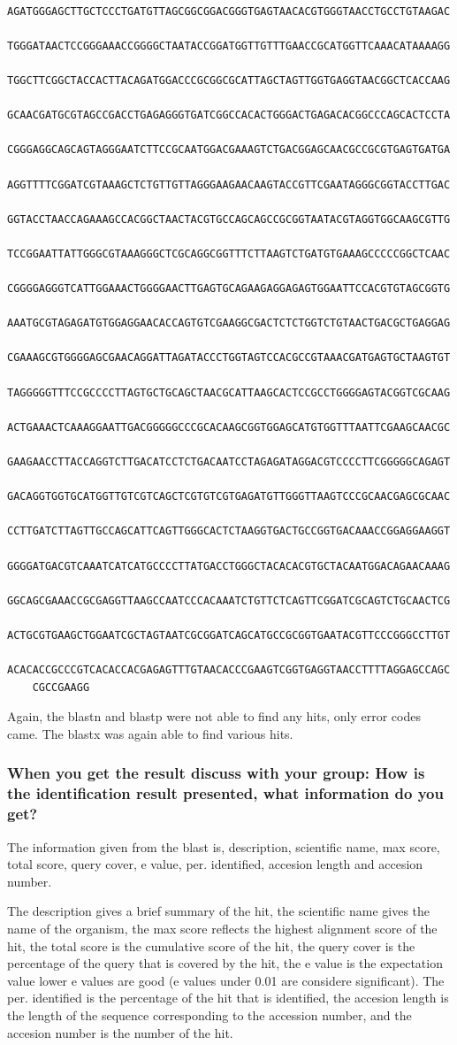 \begin{verbatim}
    AGATGGGAGCTTGCTCCCTGATGTTAGCGGCGGACGGGTGAGTAACACGTGGGTAACCTGCCTGTAAGAC
    TGGGATAACTCCGGGAAACCGGGGCTAATACCGGATGGTTGTTTGAACCGCATGGTTCAAACATAAAAGG
    TGGCTTCGGCTACCACTTACAGATGGACCCGCGGCGCATTAGCTAGTTGGTGAGGTAACGGCTCACCAAG
    GCAACGATGCGTAGCCGACCTGAGAGGGTGATCGGCCACACTGGGACTGAGACACGGCCCAGCACTCCTA
    CGGGAGGCAGCAGTAGGGAATCTTCCGCAATGGACGAAAGTCTGACGGAGCAACGCCGCGTGAGTGATGA
    AGGTTTTCGGATCGTAAAGCTCTGTTGTTAGGGAAGAACAAGTACCGTTCGAATAGGGCGGTACCTTGAC
    GGTACCTAACCAGAAAGCCACGGCTAACTACGTGCCAGCAGCCGCGGTAATACGTAGGTGGCAAGCGTTG
    TCCGGAATTATTGGGCGTAAAGGGCTCGCAGGCGGTTTCTTAAGTCTGATGTGAAAGCCCCCGGCTCAAC
    CGGGGAGGGTCATTGGAAACTGGGGAACTTGAGTGCAGAAGAGGAGAGTGGAATTCCACGTGTAGCGGTG
    AAATGCGTAGAGATGTGGAGGAACACCAGTGTCGAAGGCGACTCTCTGGTCTGTAACTGACGCTGAGGAG
    CGAAAGCGTGGGGAGCGAACAGGATTAGATACCCTGGTAGTCCACGCCGTAAACGATGAGTGCTAAGTGT
    TAGGGGGTTTCCGCCCCTTAGTGCTGCAGCTAACGCATTAAGCACTCCGCCTGGGGAGTACGGTCGCAAG
    ACTGAAACTCAAAGGAATTGACGGGGGCCCGCACAAGCGGTGGAGCATGTGGTTTAATTCGAAGCAACGC
    GAAGAACCTTACCAGGTCTTGACATCCTCTGACAATCCTAGAGATAGGACGTCCCCTTCGGGGGCAGAGT
    GACAGGTGGTGCATGGTTGTCGTCAGCTCGTGTCGTGAGATGTTGGGTTAAGTCCCGCAACGAGCGCAAC
    CCTTGATCTTAGTTGCCAGCATTCAGTTGGGCACTCTAAGGTGACTGCCGGTGACAAACCGGAGGAAGGT
    GGGGATGACGTCAAATCATCATGCCCCTTATGACCTGGGCTACACACGTGCTACAATGGACAGAACAAAG
    GGCAGCGAAACCGCGAGGTTAAGCCAATCCCACAAATCTGTTCTCAGTTCGGATCGCAGTCTGCAACTCG
    ACTGCGTGAAGCTGGAATCGCTAGTAATCGCGGATCAGCATGCCGCGGTGAATACGTTCCCGGGCCTTGT
    ACACACCGCCCGTCACACCACGAGAGTTTGTAACACCCGAAGTCGGTGAGGTAACCTTTTAGGAGCCAGC
    CGCCGAAGG    
\end{verbatim}

Again, the blastn and blastp were not able to find any hits, only error codes came. The blastx was again able to find various hits. 

\subsubsection*{When you get the result discuss with your group: How is the identification result presented, what information do you get?}
The information given from the blast is, description, scientific name, max score, total score, query cover, e value, per. identified, accesion length and accesion number.

The description gives a brief summary of the hit, the scientific name gives the name of the organism, the max score reflects the highest alignment score of the hit, the total score is the cumulative score of the hit, the query cover is the percentage of the query that is covered by the hit, the e value is the expectation value lower e values are good (e values under 0.01 are considere significant). The per. identified is the percentage of the hit that is identified, the accesion length is the length of the sequence corresponding to the accession number, and the accesion number is the number of the hit.

